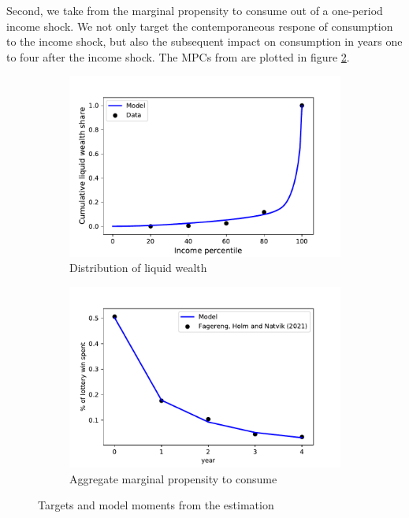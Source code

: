 \documentclass[11pt]{article}
\begin{document}
	Second, we take from \citet{fagereng_mpc_2021} the marginal propensity to consume out of a one-period income shock. We not only target the contemporaneous respone of consumption to the income shock, but also the subsequent impact on consumption in years one to four after the income shock. The MPCs from \citet{fagereng_mpc_2021} are plotted in figure \ref{fig:aggmpclotterywin}.


\begin{figure}[htb]
	\centering
	\begin{subfigure}[b]{.5\linewidth}
		\centering
		\includegraphics[width=\linewidth]{../Code/HA-Models/Target_AggMPCX_LiquWealth/Figures/LiquWealth_Distribution}
		\caption{Distribution of liquid wealth}
		\label{fig:liquwealthdistribution}
	\end{subfigure}%
	\begin{subfigure}[b]{.5\linewidth}
			\centering
		\includegraphics[width=\linewidth]{../Code/HA-Models/Target_AggMPCX_LiquWealth/Figures/AggMPC_LotteryWin}
		\caption{Aggregate marginal propensity to consume}
		\label{fig:aggmpclotterywin}
	\end{subfigure}
	\caption{Targets and model moments from the estimation}
	\label{fig:splurge_estimation}
\end{figure}
\end{document}
